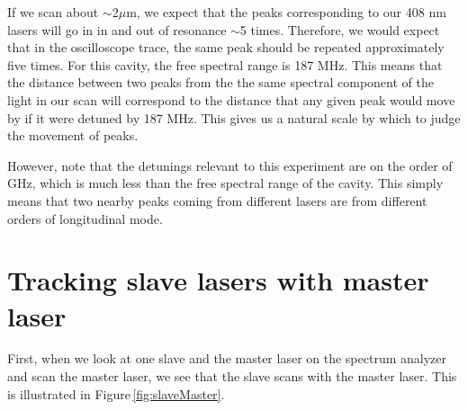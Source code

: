 If we scan about $\sim$2$\mu$m, we expect that the peaks corresponding to our 408 nm lasers will go in in and out of resonance $\sim$5 times. Therefore, we would expect that in the oscilloscope trace, the same peak should be repeated approximately five times. For this cavity, the free spectral range is 187 MHz. This means that the distance between two peaks from the the same spectral component of the light in our scan will correspond to the distance that any given peak would move by if it were detuned by 187 MHz. This gives us a natural scale by which to judge the movement of peaks. 

However, note that the detunings relevant to this experiment are on the order of GHz, which is much less than the free spectral range of the cavity. This simply means that two nearby peaks coming from different lasers are from different orders of longitudinal mode. 


\section{Tracking slave lasers with master laser}

First, when we look at one slave and the master laser on the spectrum analyzer and scan the master laser, we see that the slave scans with the master laser. This is illustrated in Figure\,\ref{fig:slaveMaster}.

